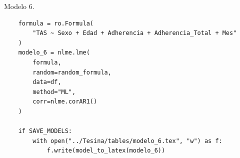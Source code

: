 \documentclass[spanish]{article}
\numberwithin{figure}{subsection}
\numberwithin{equation}{subsection}
\numberwithin{table}{subsection}
\begin{document}
Modelo 6.

\begin{lstlisting}
	formula = ro.Formula(
		"TAS ~ Sexo + Edad + Adherencia + Adherencia_Total + Mes"
	)
	modelo_6 = nlme.lme(
		formula,
		random=random_formula,
		data=df,
		method="ML",
		corr=nlme.corAR1()
	)
	
	if SAVE_MODELS:
		with open("../Tesina/tables/modelo_6.tex", "w") as f:
			f.write(model_to_latex(modelo_6))
\end{lstlisting}

\newpage
\nocite{*}
\renewcommand{\refname}{Bibliografía}

\end{document}
